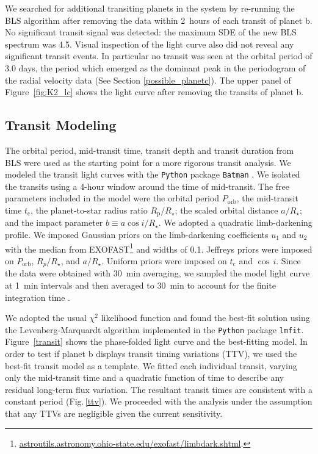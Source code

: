 \documentclass[twocolumn]{aastex61}
\begin{document}
We searched for additional transiting planets in the system by re-running the BLS algorithm after removing the data within 2~hours of each transit of planet b.  No significant transit signal was detected: the maximum SDE of the new BLS spectrum was 4.5. Visual inspection of the light curve also did not reveal any significant transit events.
In particular no transit was seen at the orbital period of 3.0 days, the period which emerged as the dominant peak in the periodogram of the radial velocity data (See Section \ref{possible_planetc}). The upper panel of Figure~\ref{fig:K2_lc} shows the light curve after removing the transits of planet b.

\subsection{Transit Modeling}\label{transit_modeling}

The orbital period, mid-transit time, transit depth and transit duration from BLS were used as the starting point for a more rigorous transit analysis. We modeled the transit light curves with the {\tt Python} package {\tt Batman} \citep{Kreidberg2015}.  We isolated the transits using a 4-hour window around the time of mid-transit.  The free parameters included in the model were the orbital period $P_{\text{orb}}$, the mid-transit time $t_{\text{c}}$, the planet-to-star radius ratio $R_{\text{p}}/R_\star$; the scaled orbital distance $a/R_\star$; and the impact parameter $b\equiv a\cos i/R_\star$. We adopted a quadratic limb-darkening profile. We imposed Gaussian priors on the limb-darkening coefficients $u_1$ and $u_2$ with the median from EXOFAST\footnote{\url{astroutils.astronomy.ohio-state.edu/exofast/limbdark.shtml}.} \citep[$u_1$= 0.52, $u_2$ = 0.19, ][]{Eastman2013} and widths of 0.1. Jeffreys priors were imposed on $P_{\text{orb}}$, $R_p/R_\star$, and $a/R_\star$. Uniform priors were imposed on $t_{\text{c}}$ and $\cos\,i$. Since the data were obtained with 30~min averaging, we sampled the model light curve at 1~min intervals and then averaged to 30~min to account for the finite integration time \citep{Kipping2010}.

We adopted the usual $\chi^2$ likelihood function and found the best-fit solution using the Levenberg-Marquardt algorithm implemented in the {\tt Python} package {\tt lmfit}. Figure~\ref{transit} shows the phase-folded light curve and the best-fitting model.  In order to test if planet b displays transit timing variations (TTV), we used the best-fit transit model as a template. We fitted each individual transit, varying only the mid-transit time and a quadratic function of time to describe any residual long-term flux variation. The resultant transit times are consistent with a constant period (Fig.\,\ref{ttv}).  We proceeded with the analysis under the assumption that any TTVs are negligible given the current sensitivity.
\end{document}
